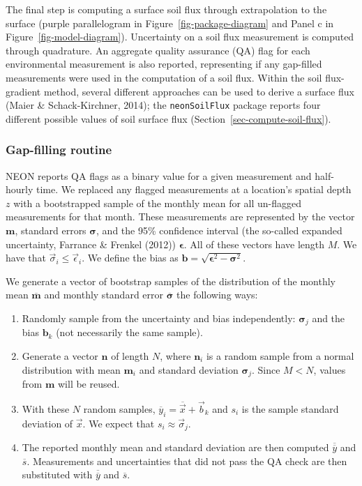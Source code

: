 \documentclass[
  letterpaper,
  DIV=11,
  numbers=noendperiod]{scrartcl}
\providecommand{\tightlist}{%
  \setlength{\itemsep}{0pt}\setlength{\parskip}{0pt}}\usepackage{longtable,booktabs,array}
\begin{document}
The final step is computing a surface soil flux through extrapolation to
the surface (purple parallelogram in Figure~\ref{fig-package-diagram}
and Panel c in Figure~\ref{fig-model-diagram}). Uncertainty on a soil
flux measurement is computed through quadrature. An aggregate quality
assurance (QA) flag for each environmental measurement is also reported,
representing if any gap-filled measurements were used in the computation
of a soil flux. Within the soil flux-gradient method, several different
approaches can be used to derive a surface flux (Maier \&
Schack-Kirchner, 2014); the \texttt{neonSoilFlux} package reports four
different possible values of soil surface flux
(Section~\ref{sec-compute-soil-flux}).

\subsubsection{Gap-filling routine}\label{sec-gapfilling}

NEON reports QA flags as a binary value for a given measurement and
half-hourly time. We replaced any flagged measurements at a location's
spatial depth \(z\) with a bootstrapped sample of the monthly mean for
all un-flagged measurements for that month. These measurements are
represented by the vector \(\mathbf{m}\), standard errors
\(\boldsymbol\sigma\), and the 95\% confidence interval (the so-called
expanded uncertainty, Farrance \& Frenkel (2012))
\(\boldsymbol\epsilon\). All of these vectors have length \(M\). We have
that \(\vec{\sigma}_{i}\leq\vec{\epsilon}_{i}\). We define the bias as
\(\mathbf{b}=\sqrt{\boldsymbol\epsilon^{2}-\boldsymbol\sigma^{2}}\).

We generate a vector of bootstrap samples of the distribution of the
monthly mean \(\overline{\boldsymbol{m}}\) and monthly standard error
\(\overline{\boldsymbol\sigma}\) the following ways:

\begin{enumerate}
\def\labelenumi{\arabic{enumi}.}
\tightlist
\item
  Randomly sample from the uncertainty and bias independently:
  \(\boldsymbol\sigma_{j}\) and the bias \(\mathbf{b}_{k}\) (not
  necessarily the same sample).
\item
  Generate a vector \(\mathbf{n}\) of length \(N\), where
  \(\mathbf{n}_{i}\) is a random sample from a normal distribution with
  mean \(\boldsymbol{m}_{i}\) and standard deviation
  \(\boldsymbol\sigma_{j}\). Since \(M<N\), values from \(\mathbf{m}\)
  will be reused.
\item
  With these \(N\) random samples,
  \(\overline{y}_{i}=\overline{\vec{x}}+\vec{b}_{k}\) and \(s_{i}\) is
  the sample standard deviation of \(\vec{x}\). We expect that
  \(s_{i} \approx \vec{\sigma}_{j}\).
\item
  The reported monthly mean and standard deviation are then computed
  \(\overline{\overline{y}}\) and \(\overline{s}\). Measurements and
  uncertainties that did not pass the QA check are then substituted with
  \(\overline{\overline{y}}\) and \(\overline{s}\).
\end{enumerate}
\end{document}
